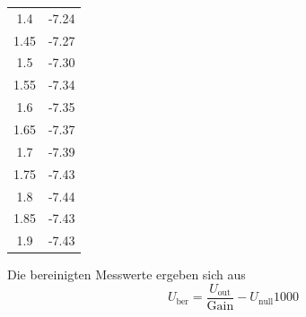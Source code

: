 \begin{table}
\begin{subtable}{0.48\textwidth}
\begin{tabular}{SS}
    1.4 & -7.24 \\
    1.45 & -7.27 \\
    1.5 & -7.30 \\
    1.55 & -7.34 \\
    1.6 & -7.35 \\
    1.65 & -7.37 \\
    1.7 & -7.39 \\
    1.75 & -7.43 \\
    1.8 & -7.44 \\
    1.85 & -7.43 \\
    1.9 & -7.43 \\
    \bottomrule
  \end{tabular}
  \end{subtable}
  \end{table}

Die bereinigten Messwerte ergeben sich aus
\begin{equation}
  U_{\mathrm{ber}} = \frac{U_{\mathrm{out}}}{\text{Gain}} - {U_{\mathrm{null}}}{1000}
\end {equation}
